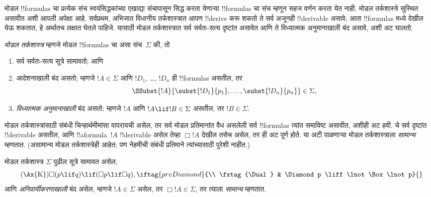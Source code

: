 \documentclass[../../../include/open-logic-section]{subfiles}
\begin{document}


मोडल !!{formula}s चा प्रत्येक संच स्वयंसिद्धकांच्या
एखाद्या संचापासून सिद्ध करता येणाऱ्या
!!{formula}s चा संच म्हणून सहज वर्णन करता येत
नाही. मोडल तर्कशास्त्रे सुस्थित असावीत अशी
आपली अपेक्षा आहे. सर्वप्रथम, अभिजात विधानीय
तर्कशास्त्रात आपण !!{derive} करू शकतो ते सर्व
अजूनही !!{derivable} असावे; आता !!{formula}s
मध्ये  देखील
येऊ शकतात, हे अर्थातच लक्षात घेतले पाहिजे.
यासाठी मोडल तर्कशास्त्रात सर्व सर्वतः-सत्य दृष्टांत
असावेत आणि ते विध्यात्मक अनुमानाखाली बंद असावे,
अशी अट घालतो.

\begin{defn}
  \emph{मोडल तर्कशास्त्र} म्हणजे मोडल !!{formula}s
  चा असा संच~$\Sigma$ की, तो
  \begin{enumerate}
  \item सर्व सर्वतः-सत्य सूत्रे सामावतो; आणि
  \item आदेशनाखाली बंद असतो; म्हणजे $!A \in \Sigma$
    आणि $!D_1$, \dots, $!D_n$ ही !!{formula}s
    असतील, तर
    \[
    \SSubst{!A}{\subst{!D_1}{p_1}, \dots, \subst{!D_n}{p_n}} \in \Sigma,
    \]
    \item \emph{विध्यात्मक अनुमानाखाली} बंद असतो;
    म्हणजे $!A$ आणि $!A
      \lif !B \in \Sigma$ असतील, तर $!B \in \Sigma$.
  \end{enumerate}
\end{defn}

मोडल तर्कशास्त्रांसाठी संबंधी चिन्हार्थमीमांसा
वापरायची असेल, तर सर्व मोडल प्रतिमानांत वैध
असलेली सर्व !!{formula}s त्यांत समाविष्ट असावीत,
अशीही अट हवी. 
चे सर्व दृष्टांत !!{derivable} असतील, आणि
!!a{formula}~$!A$ !!{derivable} असेल तेव्हा
$\Box !A$ देखील तसेच असेल, तर ही अट पूर्ण होते.
या अटी पाळणाऱ्या मोडल तर्कशास्त्राला
\emph{सामान्य} म्हणतात. (असामान्य मोडल तर्कशास्त्रेही
आहेत; पण नेहमीची संबंधी प्रतिमाने त्यांच्यासाठी
पुरेशी नाहीत.)

\begin{defn}
  मोडल तर्कशास्त्र $\Sigma$ पुढील सूत्रे सामावत असेल,
  \begin{align*}
    \tag{\Ax{K}} & \Box(p \lif q) \lif (\Box p \lif \Box q),
    \iftag{prvDiamond}{\\
      \tag{\Dual} & \Diamond p \liff \lnot\Box\lnot p}{}
  \end{align*}
  आणि \emph{अनिवार्यीकरणाखाली} बंद असेल, म्हणजे
  $!A \in
  \Sigma$ असेल, तर $\Box !A \in \Sigma$,
  तर त्याला \emph{सामान्य} म्हणतात.
\end{defn}
\end{document}
